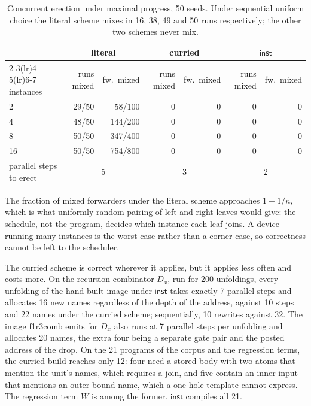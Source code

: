 \documentclass[acmsmall,screen,review,anonymous]{acmart}
\newcommand{\inst}{\mathsf{inst}}
\newcommand{\tool}{\textsf{f1r3comb}}
\begin{document}
\begin{table}[t]
\small
\begin{tabular}{@{}lrrrrrr@{}}
\toprule
& \multicolumn{2}{c}{literal} & \multicolumn{2}{c}{curried} & \multicolumn{2}{c}{$\inst$}\\
\cmidrule(lr){2-3}\cmidrule(lr){4-5}\cmidrule(lr){6-7}
instances & runs mixed & fw.\ mixed & runs mixed & fw.\ mixed & runs mixed & fw.\ mixed\\
\midrule
2  & 29/50 &  58/100 & 0 & 0 & 0 & 0\\
4  & 48/50 & 144/200 & 0 & 0 & 0 & 0\\
8  & 50/50 & 347/400 & 0 & 0 & 0 & 0\\
16 & 50/50 & 754/800 & 0 & 0 & 0 & 0\\
\midrule
parallel steps to erect & \multicolumn{2}{c}{5} & \multicolumn{2}{c}{3} & \multicolumn{2}{c}{2}\\
\bottomrule
\end{tabular}
\caption{Concurrent erection under maximal progress, 50 seeds. Under
sequential uniform choice the literal scheme mixes in 16, 38, 49 and 50 runs
respectively; the other two schemes never mix.}
\label{tab:erect}
\end{table}

The fraction of mixed forwarders under the literal scheme approaches
$1 - 1/n$, which is what uniformly random pairing of left and right leaves would
give: the schedule, not the program, decides which instance each leaf joins.
A device running many instances is the worst case rather than a corner case,
so correctness cannot be left to the scheduler.

The curried scheme is correct wherever it applies, but it applies less often
and costs more. On the recursion combinator $D_{x}$, run for 200 unfoldings,
every unfolding of the hand-built image under $\inst$ takes exactly 7
parallel steps and allocates 16 new names regardless of the depth of the
address, against 10 steps and 22 names under the curried scheme;
sequentially, 10 rewrites against 32. The image \tool{} emits for $D_{x}$ also
runs at 7 parallel steps per unfolding and allocates 20 names, the extra four
being a separate gate pair and the posted address of the drop. On the 21
programs of the corpus and the regression terms, the curried build reaches
only 12: four need
a stored body with two atoms that mention the unit's names, which requires a
join, and five contain an inner input that mentions an outer bound name, which
a one-hole template cannot express. The regression term $W$ is among the
former. $\inst$ compiles all 21.
\end{document}
